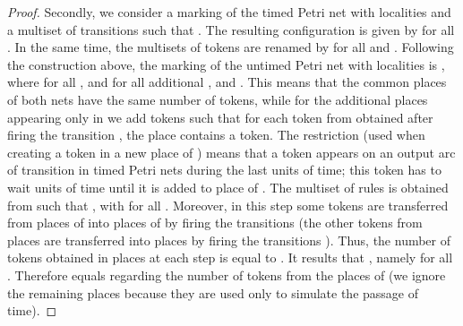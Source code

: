 \documentclass{eptcs}
\begin{document}
\begin{proof}
Secondly, we consider a marking  of the timed Petri net with localities
and a multiset  of transitions such that . The
resulting configuration  is given by  for all . In the same time, the
multisets of tokens  are renamed by  for all
 and . Following the construction above,
the marking of the untimed Petri net with localities is , where
 for all , and  for all additional , 
and . This means that the common places of both nets have
the same number of tokens, while for the additional places appearing only in
 we add tokens such that for each token from  obtained
after firing the transition , the place  contains a token. The
restriction  (used when creating a token in a new
place  of ) means that a token appears on an output arc of
transition  in timed Petri nets during the last  units of time;
this token has to wait  units of time until it is added to place  of .
The multiset of rules  is obtained from  such that , with  for
all . Moreover, in this step some tokens are transferred from places
of  into places of  by firing the transitions  (the other tokens
from places  are transferred into places 
by firing the transitions ). Thus, the number of tokens obtained in
places  at each step  is equal to . It
results that , namely
 for all . Therefore  equals
 regarding the number of tokens from the places of  (we ignore the
remaining places  because they are used only to simulate the
passage of time).
\end{proof}
\end{document}
